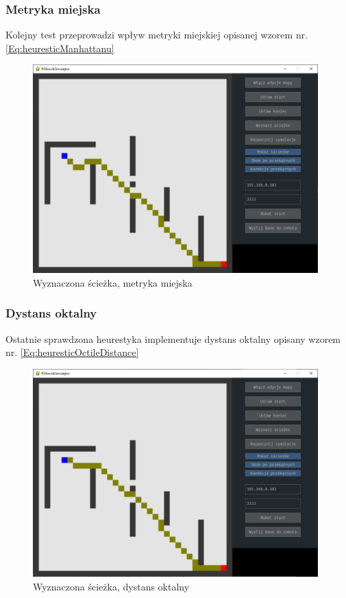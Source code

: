 \subsubsection{Metryka miejska}
Kolejny test przeprowadzi wpływ metryki miejskiej opisanej wzorem nr. \eqref{Eq:heuresticManhattanu}

\begin{figure}[H]
	\centering
	\includegraphics[width=11cm]{pages/testy/zdjecia/test3_taxi.png}
	\caption{Wyznaczona ścieżka, metryka miejska}
\end{figure}

\subsubsection{Dystans oktalny}
Ostatnie sprawdzona heurestyka implementuje dystans oktalny opisany wzorem nr. \eqref{Eq:heuresticOctileDistance}
\begin{figure}[H]
	\centering
	\includegraphics[width=11cm]{pages/testy/zdjecia/test3_H_przek.png}
	\caption{Wyznaczona ścieżka, dystans oktalny}
\end{figure}


